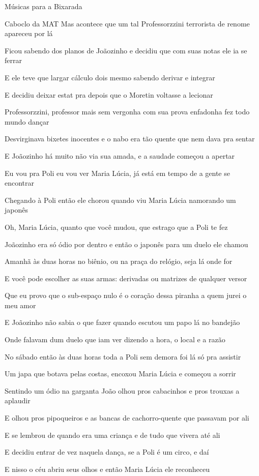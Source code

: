 \begin{secao}{Músicas para a Bixarada}
\begin{subsecao}{Caboclo da MAT}
Mas acontece que um tal Professorzzini terrorista de renome apareceu por lá

Ficou sabendo dos planos de Joãozinho e decidiu que com suas notas ele ia se
ferrar

E ele teve que largar cálculo dois mesmo sabendo derivar e integrar

E decidiu deixar estat pra depois que o Moretin voltasse a lecionar

Professorzzini, professor mais sem vergonha com sua prova enfadonha fez todo
mundo dançar

Desvirginava bixetes inocentes e o nabo era tão quente que nem dava pra sentar

E Joãozinho há muito não via sua amada, e a saudade começou a apertar

Eu vou pra Poli eu vou ver Maria Lúcia, já está em tempo de a gente se encontrar

Chegando à Poli então ele chorou quando viu Maria Lúcia namorando um japonês

Oh, Maria Lúcia, quanto que você mudou, que estrago que a Poli te fez

Joãozinho era só ódio por dentro e então o japonês para um duelo ele chamou

Amanhã às duas horas no biênio, ou na praça do relógio, seja lá onde for

E você pode escolher as suas armas: derivadas ou matrizes de qualquer versor

Que eu provo que o sub-espaço nulo é o coração dessa piranha a quem jurei o meu
amor

E Joãozinho não sabia o que fazer quando escutou um papo lá no bandejão

Onde falavam dum duelo que iam ver dizendo a hora, o local e a razão

No sábado então às duas horas toda a Poli sem demora foi lá só pra assistir

Um japa que botava pelas costas, encoxou Maria Lúcia e começou a sorrir

Sentindo um ódio na garganta João olhou pros cabacinhos e pros trouxas a
aplaudir

E olhou pros pipoqueiros e as bancas de cachorro-quente que passavam por ali

E se lembrou de quando era uma criança e de tudo que vivera até ali

E decidiu entrar de vez naquela dança, se a Poli é um circo, e daí

E nisso o céu abriu seus olhos e então Maria Lúcia ele reconheceu


\end{subsecao}
\end{secao}

